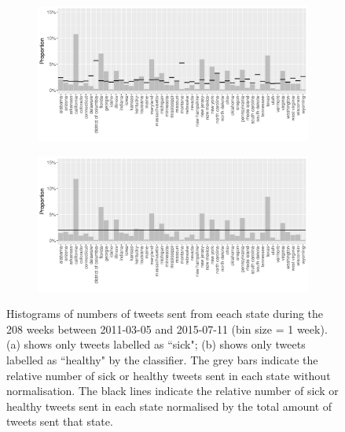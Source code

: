 \documentclass[11pt, a4paper,twoside]{report}\usepackage[]{graphicx}\usepackage[]{color}
\begin{document}
\begin{figure}[H]
\centering
  \begin{subfigure}[t]{1\textwidth}
  \includegraphics[width=1\linewidth]{20_activity_sick_statename_Twitter_full_aggregatedoverlay.pdf}
  \caption{}
  \end{subfigure}
\hfill
  \begin{subfigure}[t]{1\textwidth}
  \includegraphics[width=1\linewidth]{21_activity_healthy_statename_Twitter_full_aggregatedoverlay.pdf}
  \caption{}
  \end{subfigure}
  
  \caption{Histograms of numbers of tweets sent from eeach state during the 208 weeks between 2011-03-05 and 2015-07-11 (bin size = 1 week). (a) shows only tweets labelled as ``sick"; (b) shows only tweets labelled as ``healthy" by the classifier. The grey bars indicate the relative number of sick or healthy tweets sent in each state without normalisation. The black lines indicate the relative number of sick or healthy tweets sent in each state normalised by the total amount of tweets sent that state.}
  \label{fig:tweets_state_healthy_sick}
\end{figure}
\end{document}
